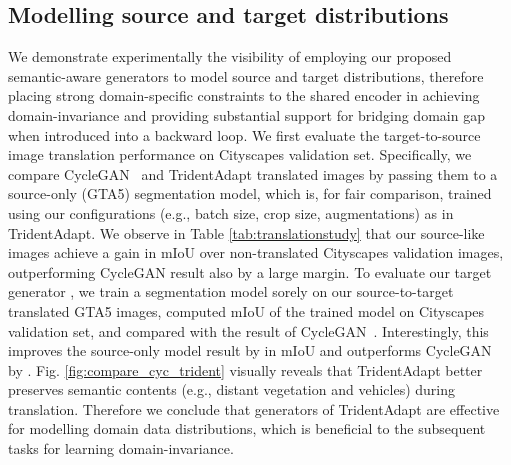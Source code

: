 \documentclass{bmvc2k}
\newcommand{\Fig}[1]{Fig. \ref{fig:#1}}
\newcommand{\Tab}[1]{Table \ref{tab:#1}}
\begin{document}
\subsection{Modelling source and target distributions}





We demonstrate experimentally the visibility of employing our proposed semantic-aware generators to model source and target distributions, therefore placing strong domain-specific constraints to the shared encoder in achieving domain-invariance and providing substantial support for bridging domain gap when introduced into a backward loop. We first evaluate the target-to-source image translation performance on Cityscapes validation set. Specifically, we compare CycleGAN~\cite{zhu2017unpaired} and TridentAdapt translated images by passing them to a source-only (GTA5) segmentation model, which is, for fair comparison, trained using our configurations (e.g., batch size, crop size, augmentations) as in TridentAdapt. We observe in \Tab{translationstudy} that our source-like images achieve a  gain in mIoU over non-translated Cityscapes validation images, outperforming CycleGAN result also by a large margin.
To evaluate our target generator , we train a segmentation model sorely on our source-to-target translated GTA5 images, computed mIoU of the trained model on Cityscapes validation set, and compared with the result of CycleGAN~\cite{zhu2017unpaired}. Interestingly, this improves the source-only model result by  in mIoU and outperforms CycleGAN~\cite{zhu2017unpaired} by .
\Fig{compare_cyc_trident} visually reveals that TridentAdapt better preserves semantic contents (e.g., distant vegetation and vehicles) during translation. Therefore we conclude that generators of TridentAdapt are effective for modelling domain data distributions, which is beneficial to the subsequent tasks for learning domain-invariance.
\end{document}

